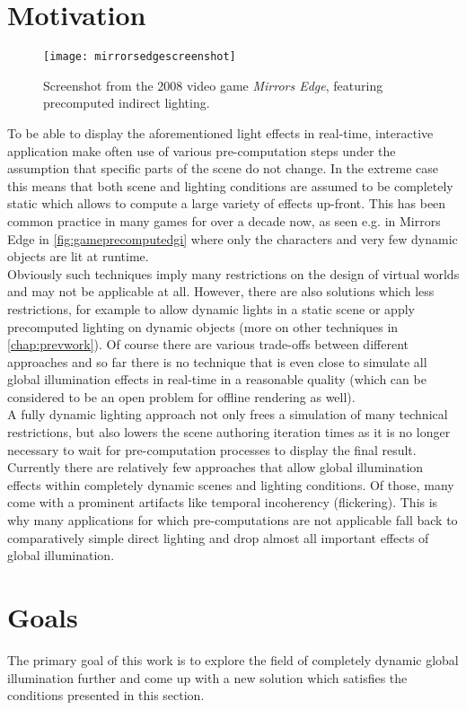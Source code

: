 \documentclass[thesis.tex]{subfiles}
\begin{document}
\section{Motivation} 
\begin{figure}[h]
\centering
\texttt{[image: mirrorsedgescreenshot]}
\caption{Screenshot from the 2008 video game \emph{Mirrors Edge}, featuring precomputed indirect lighting.}
\label{fig:gameprecomputedgi}
\end{figure}
To be able to display the aforementioned light effects in real-time, interactive application make often use of various pre-computation steps under the assumption that specific parts of the scene do not change.
In the extreme case this means that both scene and lighting conditions are assumed to be completely static which allows to compute a large variety of effects up-front.
This has been common practice in many games for over a decade now, as seen e.g. in Mirrors Edge in \autoref{fig:gameprecomputedgi} where only the characters and very few dynamic objects are lit at runtime.
\\
Obviously such techniques imply many restrictions on the design of virtual worlds and may not be applicable at all.
However, there are also solutions which less restrictions, for example to allow dynamic lights in a static scene or apply precomputed lighting on dynamic objects (more on other techniques in \autoref{chap:prevwork}).
Of course there are various trade-offs between different approaches and so far there is no technique that is even close to simulate all global illumination effects in real-time in a reasonable quality (which can be considered to be an open problem for offline rendering as well).
\\
A fully dynamic lighting approach not only frees a simulation of many technical restrictions, but also lowers the scene authoring iteration times as it is no longer necessary to wait for pre-computation processes to display the final result.
Currently there are relatively few approaches that allow global illumination effects within completely dynamic scenes and lighting conditions.
Of those, many come with a prominent artifacts like temporal incoherency (flickering).
This is why many applications for which pre-computations are not applicable fall back to comparatively simple direct lighting and drop almost all important effects of global illumination.

\section{Goals} \label{bib:goals}
The primary goal of this work is to explore the field of completely dynamic global illumination further and come up with a new solution which satisfies the conditions presented in this section.
\end{document}
